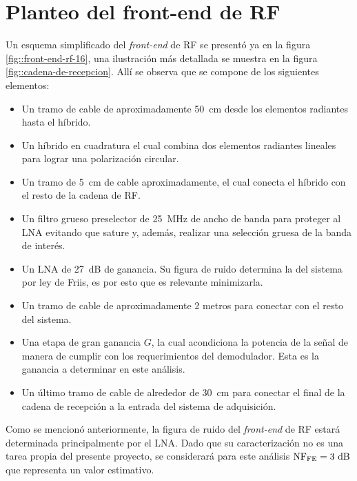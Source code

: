 \documentclass[../../main.tex]{subfiles}
\begin{document}
\section{Planteo del front-end de RF}
Un esquema simplificado del \textit{front-end} de RF se presentó ya en la figura \ref{fig::front-end-rf-16}, una ilustración más detallada  se muestra en la figura \ref{fig::cadena-de-recepcion}. Allí se observa que se compone de los siguientes elementos:
\begin{itemize}
    \item Un tramo de cable de aproximadamente 50~cm desde los elementos radiantes hasta el híbrido.
    \item Un híbrido en cuadratura el cual combina dos elementos radiantes lineales para lograr una polarización circular.
    \item Un tramo de 5~cm de cable aproximadamente, el cual conecta el híbrido con el resto de la cadena de RF.
    \item Un filtro grueso preselector de 25~MHz de ancho de banda para proteger al LNA evitando que sature y, además, realizar una selección gruesa de la banda de interés.
    \item Un LNA de 27~dB de ganancia. Su figura de ruido determina la del sistema por ley de Friis, es por esto que es relevante minimizarla.
    \item Un tramo de cable de aproximadamente 2 metros para conectar con el resto del sistema.
    \item Una etapa de gran ganancia $G$, la cual acondiciona la potencia de la señal de manera de cumplir con los requerimientos del demodulador. Esta es la ganancia a determinar en este análisis.
    \item Un último tramo de cable de alrededor de 30~cm para conectar el final de la cadena de recepción a la entrada del sistema de adquisición.
\end{itemize}

Como se mencionó anteriormente, la figura de ruido del \textit{front-end} de RF estará determinada principalmente por el LNA. Dado que su caracterización no es una tarea propia del presente proyecto, se considerará para este análisis $\textrm{NF}_\textrm{FE} = 3~\textrm{dB}$ que representa un valor estimativo.

\end{document}
